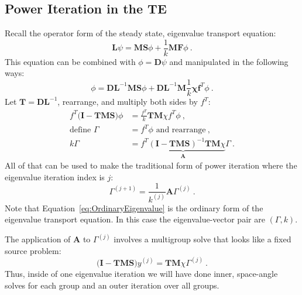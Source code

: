 \documentclass[12pt]{article}
\newcommand{\ve}[1]{\ensuremath{\mathbf{#1}}}
\begin{document}
\subsection*{Power Iteration in the TE}
Recall the operator form of the steady state, eigenvalue transport equation:
\[
\mathbf{L} \psi = \mathbf{MS}\phi +\frac{1}{k}\mathbf{MF}\phi \:.
\]
This equation can be combined with $\phi = \mathbf{D} \psi$ and manipulated in the following ways:
%
\begin{equation}
  \phi = \ve{DL}^{-1}\ve{MS}\phi + \ve{DL}^{-1}\ve{M}\frac{1}{k}\ve{\chi} \ve{f}^{T} \phi \:.
\end{equation}
%
Let $\ve{T} = \ve{DL}^{-1}$, rearrange, and multiply both sides by $f^{T}$:
\begin{align}
  f^{T}\bigl(\ve{I} - \ve{TMS}\bigr)\phi &= \frac{f^{T}}{k} \ve{TM}\chi f^{T} \phi \:, \label{eq:OperatorEvalForm} \\
  \text{define } \Gamma &= f^{T}\phi  \text{ and rearrange} \:, \nonumber \\
  k \Gamma &= \underbrace{f^{T}(\ve{I} - \ve{TMS})^{-1} \ve{TM} \chi}_{\ve{A}} \Gamma \:. \label{eq:OrdinaryEigenvalue}
\end{align}
%
All of that can be used to make the traditional form of power iteration where the eigenvalue iteration index is $j$:
%
\begin{equation}
  \Gamma^{(j+1)} =  \frac{1}{k^{(j)}}\ve{A} \Gamma^{(j)} \:.
\label{eq:PowerItForm} 
\end{equation}
Note that Equation~\eqref{eq:OrdinaryEigenvalue} is the ordinary form of the eigenvalue transport equation. In this case the eigenvalue-vector pair are $(\Gamma, k)$. 

The application of $\ve{A}$ to $\Gamma^{(j)}$ involves a multigroup solve that looks like a fixed source problem:
%
\begin{equation}
  \bigl(\ve{I} - \ve{TMS}\bigr)y^{(j)} = \ve{TM}\chi \Gamma^{(j)} \:.
\end{equation}
%
Thus, inside of one eigenvalue iteration we will have done inner, space-angle solves for each group and an outer iteration over all groups. 
\end{document}

